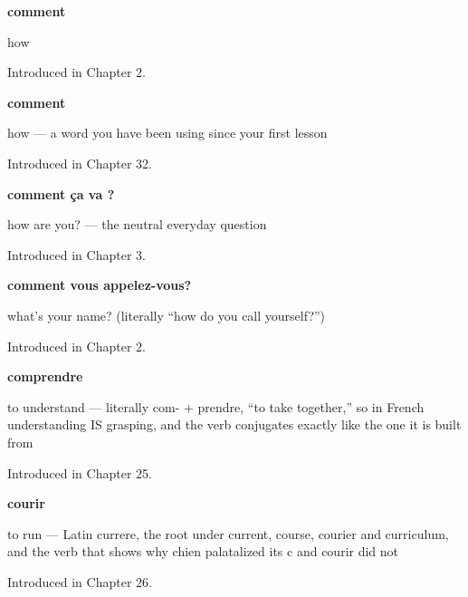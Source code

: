 \noindent\begin{minipage}[t]{\linewidth}
\raggedright
\textbf{comment}\par
\small how\par
\footnotesize Introduced in Chapter 2.
\end{minipage}\par\medskip

\noindent\begin{minipage}[t]{\linewidth}
\raggedright
\textbf{comment}\par
\small how — a word you have been using since your first lesson\par
\footnotesize Introduced in Chapter 32.
\end{minipage}\par\medskip

\noindent\begin{minipage}[t]{\linewidth}
\raggedright
\textbf{comment ça va ?}\par
\small how are you? — the neutral everyday question\par
\footnotesize Introduced in Chapter 3.
\end{minipage}\par\medskip

\noindent\begin{minipage}[t]{\linewidth}
\raggedright
\textbf{comment vous appelez-vous?}\par
\small what's your name? (literally \textquotedblleft{}how do you call yourself?\textquotedblright{})\par
\footnotesize Introduced in Chapter 2.
\end{minipage}\par\medskip

\noindent\begin{minipage}[t]{\linewidth}
\raggedright
\textbf{comprendre}\par
\small to understand — literally com- + prendre, \textquotedblleft{}to take together,\textquotedblright{} so in French understanding IS grasping, and the verb conjugates exactly like the one it is built from\par
\footnotesize Introduced in Chapter 25.
\end{minipage}\par\medskip

\noindent\begin{minipage}[t]{\linewidth}
\raggedright
\textbf{courir}\par
\small to run — Latin currere, the root under current, course, courier and curriculum, and the verb that shows why chien palatalized its c and courir did not\par
\footnotesize Introduced in Chapter 26.
\end{minipage}\par\medskip

